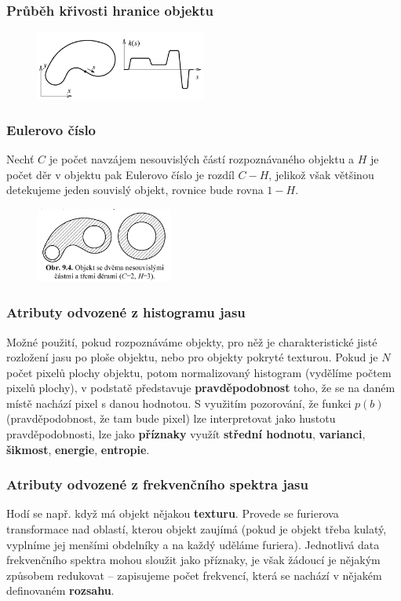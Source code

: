 \subsubsection{Průběh křivosti hranice objektu}
\begin{figure}[H]
	\centering
	\includegraphics[width=0.5\textwidth]{assets/9_krivost}
\end{figure}

\subsubsection{Eulerovo číslo}
Nechť $C$ je počet navzájem nesouvislých částí rozpoznávaného objektu a $H$ je počet děr v objektu pak Eulerovo číslo je rozdíl $C - H$, jelikož však většinou detekujeme jeden souvislý objekt, rovnice bude rovna $1 - H$.
\begin{figure}[H]
	\centering
	\includegraphics[width=0.4\textwidth]{assets/9_euler}
\end{figure}

\subsubsection{Atributy odvozené z histogramu jasu}
Možné použití, pokud rozpoznáváme objekty, pro něž je charakteristické jisté rozložení jasu po ploše objektu, nebo pro objekty pokryté texturou. Pokud je $N$ počet pixelů plochy objektu, potom normalizovaný histogram (vydělíme počtem pixelů plochy), v podstatě představuje \textbf{pravděpodobnost} toho, že se na daném místě nachází pixel s danou hodnotou. S využitím pozorování, že funkci $p(b)$ (pravděpodobnost, že tam bude pixel) lze interpretovat jako hustotu pravděpodobnosti, lze jako \textbf{příznaky} využít \textbf{střední hodnotu}, \textbf{varianci}, \textbf{šikmost}, \textbf{energie}, \textbf{entropie}.

\subsubsection{Atributy odvozené z frekvenčního spektra jasu}
Hodí se např. když má objekt nějakou \textbf{texturu}. Provede se furierova transformace nad oblastí, kterou objekt zaujímá (pokud je objekt třeba kulatý, vyplníme jej menšími obdelníky a na každý uděláme furiera). Jednotlivá data frekvenčního spektra mohou sloužit jako příznaky, je však žádoucí je nějakým způsobem redukovat -- zapisujeme počet frekvencí, která se nachází v nějakém definovaném \textbf{rozsahu}.

